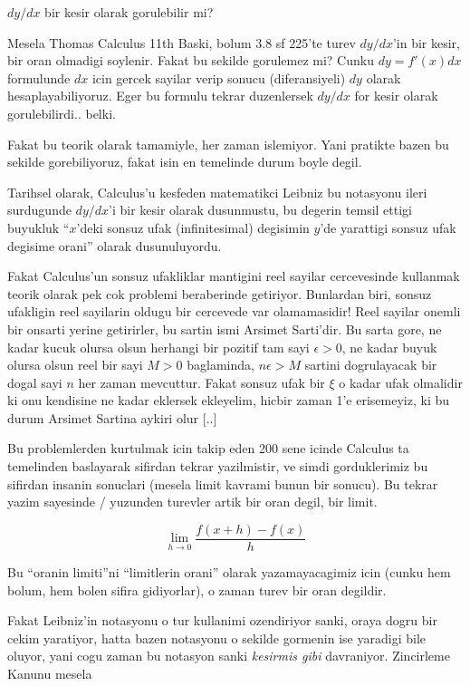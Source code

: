 \documentclass[12pt,fleqn]{article}\usepackage{../common}
\begin{document}
$dy/dx$ bir kesir olarak gorulebilir mi? 

Mesela Thomas Calculus 11th Baski, bolum 3.8 sf 225'te turev $dy/dx$'in bir
kesir, bir oran olmadigi soylenir. Fakat bu sekilde gorulemez mi? Cunku $dy
= f'(x)dx$ formulunde $dx$ icin gercek sayilar verip sonucu (diferansiyeli)
$dy$ olarak hesaplayabiliyoruz. Eger bu formulu tekrar duzenlersek $dy/dx$
for kesir olarak gorulebilirdi.. belki.

Fakat bu teorik olarak tamamiyle, her zaman islemiyor. Yani pratikte bazen
bu sekilde gorebiliyoruz, fakat isin en temelinde durum boyle degil.

Tarihsel olarak, Calculus'u kesfeden matematikci Leibniz bu notasyonu ileri
surdugunde $dy/dx$'i bir kesir olarak dusunmustu, bu degerin temsil ettigi
buyukluk ``$x$'deki sonsuz ufak (infinitesimal) degisimin $y$'de yarattigi
sonsuz ufak degisime orani'' olarak dusunuluyordu.

Fakat Calculus'un sonsuz ufakliklar mantigini reel sayilar cercevesinde
kullanmak teorik olarak pek cok problemi beraberinde getiriyor. Bunlardan
biri, sonsuz ufakligin reel sayilarin oldugu bir cercevede var
olamamasidir! Reel sayilar onemli bir onsarti yerine getirirler, bu sartin
ismi Arsimet Sarti'dir. Bu sarta gore, ne kadar kucuk olursa olsun herhangi
bir pozitif tam sayi $\epsilon > 0$, ne kadar buyuk olursa olsun reel bir
sayi $M>0$ baglaminda, $n\epsilon > M$ sartini dogrulayacak bir dogal sayi
$n$ her zaman mevcuttur. Fakat sonsuz ufak bir $\xi$ o kadar ufak olmalidir
ki onu kendisine ne kadar eklersek ekleyelim, hicbir zaman 1'e erisemeyiz,
ki bu durum Arsimet Sartina aykiri olur [..]

Bu problemlerden kurtulmak icin takip eden 200 sene icinde Calculus ta
temelinden baslayarak sifirdan tekrar yazilmistir, ve simdi gorduklerimiz
bu sifirdan insanin sonuclari (mesela limit kavrami bunun bir sonucu). Bu
tekrar yazim sayesinde / yuzunden turevler artik bir oran degil, bir limit.

\[ \lim_{h \to 0} \frac{f(x+h) - f(x)}{h}\]

Bu ``oranin limiti''ni ``limitlerin orani'' olarak yazamayacagimiz icin
(cunku hem bolum, hem bolen sifira gidiyorlar), o zaman turev bir oran
degildir.

Fakat Leibniz'in notasyonu o tur kullanimi ozendiriyor sanki, oraya dogru
bir cekim yaratiyor, hatta bazen notasyonu o sekilde gormenin ise yaradigi
bile oluyor, yani cogu zaman bu notasyon sanki {\em kesirmis gibi}
davraniyor. Zincirleme Kanunu mesela 
\end{document}
